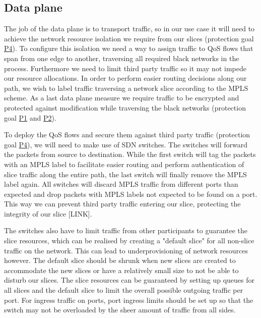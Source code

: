 \subsection{Data plane}
The job of the data plane is to transport traffic, so in our use case it will need to achieve the network resource isolation we require from our slices (protection goal \hyperref[P4]{P4}). To configure this isolation we need a way to assign traffic to QoS flows that span from one edge to another, traversing all required black networks in the process. Furthermore we need to limit third party traffic so it may not impede our resource allocations. In order to perform easier routing decisions along our path, we wish to label traffic traversing a network slice according to the MPLS scheme. As a last data plane measure we require traffic to be encrypted and protected against modification while traversing the black networks (protection goal \hyperref[P1]{P1} and \hyperref[P2]{P2}).

To deploy the QoS flows and secure them against third party traffic (protection goal \hyperref[P4]{P4}), we will need to make use of SDN switches. The switches will forward the packets from source to destination. While the first switch will tag the packets with an MPLS label to facilitate easier routing and perform authentication of slice traffic along the entire path, the last switch will finally remove the MPLS label again. All switches will discard MPLS traffic from different ports than expected and drop packets with MPLS labels not expected to be found on a port. This way we can prevent third party traffic entering our slice, protecting the integrity of our slice [LINK].

The switches also have to limit traffic from other participants to guarantee the slice resources, which can be realised by creating a "default slice" for all non-slice traffic on the network. This can lead to underprovisioning of network resources however. The default slice should be shrunk when new slices are created to accommodate the new slices or have a relatively small size to not be able to disturb our slices. The slice resources can be guaranteed by setting up queues for all slices and the default slice to limit the overall possible outgoing traffic per port. For ingress traffic on ports, port ingress limits should be set up so that the switch may not be overloaded by the sheer amount of traffic from all sides.

